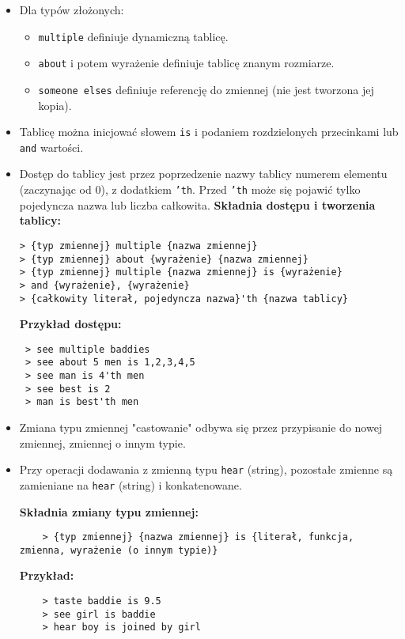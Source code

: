 \documentclass{article}
\begin{document}
\begin{itemize}
    \item Dla typów złożonych:
    \begin{itemize}
        \item \texttt{multiple} definiuje dynamiczną tablicę.
        \item \texttt{about} i potem wyrażenie definiuje tablicę znanym rozmiarze.
        \item \texttt{someone elses} definiuje referencję do zmiennej (nie jest tworzona jej kopia).
    \end{itemize}
    \item Tablicę można inicjować słowem \texttt{is} i podaniem rozdzielonych przecinkami lub \texttt{and} wartości.
    \item Dostęp do tablicy jest przez poprzedzenie nazwy tablicy numerem elementu (zaczynając od 0), z dodatkiem \texttt{'th}. Przed \texttt{'th} może się pojawić tylko pojedyncza nazwa lub liczba całkowita.
    \textbf{Składnia dostępu i tworzenia tablicy:}
{\color{green}
\begin{Verbatim}
> {typ zmiennej} multiple {nazwa zmiennej}
> {typ zmiennej} about {wyrażenie} {nazwa zmiennej}
> {typ zmiennej} multiple {nazwa zmiennej} is {wyrażenie}
> and {wyrażenie}, {wyrażenie}
> {całkowity literał, pojedyncza nazwa}'th {nazwa tablicy}
\end{Verbatim}
}

\textbf{Przykład dostępu:}
{\color{green}
\begin{verbatim}
 > see multiple baddies
 > see about 5 men is 1,2,3,4,5
 > see man is 4'th men
 > see best is 2
 > man is best'th men
\end{verbatim}
}
    \item Zmiana typu zmiennej "castowanie" odbywa się przez przypisanie do nowej zmiennej, zmiennej o innym typie.
    \item Przy operacji dodawania z zmienną typu \texttt{hear} (string), pozostałe zmienne są zamieniane na \texttt{hear} (string) i konkatenowane.

    \textbf{Składnia zmiany typu zmiennej:}
    {\color{green}
    \begin{Verbatim}
    > {typ zmiennej} {nazwa zmiennej} is {literał, funkcja, zmienna, wyrażenie (o innym typie)}
    \end{Verbatim}
    }

    \textbf{Przykład:}
    {\color{green}
    \begin{verbatim}
    > taste baddie is 9.5
    > see girl is baddie
    > hear boy is joined by girl
    \end{verbatim}
    }
\end{itemize}
\end{document}
